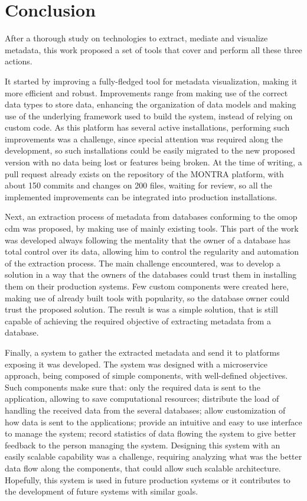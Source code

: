 
\chapter{Conclusion}
\label{chapter:conclusion}
After a thorough study on technologies to extract, mediate and visualize metadata, this work proposed a set of tools that cover and perform all these three actions.

It started by improving a fully-fledged tool for metadata visualization, making it more efficient and robust.
Improvements range from making use of the correct data types to store data, enhancing the organization of data models and making use of the underlying framework used to build the system, instead of relying on custom code.
As this platform has several active installations, performing such improvements was a challenge, since special attention was required along the development, so such installations could be easily migrated to the new proposed version with no data being lost or features being broken.
At the time of writing, a pull request already exists on the repository of the MONTRA platform, with about 150 commits and changes on 200 files, waiting for review, so all the implemented improvements can be integrated into production installations.

Next, an extraction process of metadata from databases conforming to the \gls{omop} \gls{cdm} was proposed, by making use of mainly existing tools.
This part of the work was developed always following the mentality that the owner of a database has total control over its data, allowing him to control the regularity and automation of the extraction process.
The main challenge encountered, was to develop a solution in a way that the owners of the databases could trust them in installing them on their production systems.
Few custom components were created here, making use of already built tools with popularity, so the database owner could trust the proposed solution.
The result is was a simple solution, that is still capable of achieving the required objective of extracting metadata from a database.

Finally, a system to gather the extracted metadata and send it to platforms exposing it was developed.
The system was designed with a microservice approach, being composed of simple components, with well-defined objectives.
Such components make sure that: only the required data is sent to the application, allowing to save computational resources; distribute the load of handling the received data from the several databases; allow customization of how data is sent to the applications; provide an intuitive and easy to use interface to manage the system; record statistics of data flowing the system to give better feedback to the person managing the system.
Designing this system with an easily scalable capability was a challenge, requiring analyzing what was the better data flow along the components, that could allow such scalable architecture.
Hopefully, this system is used in future production systems or it contributes to the development of future systems with similar goals.

